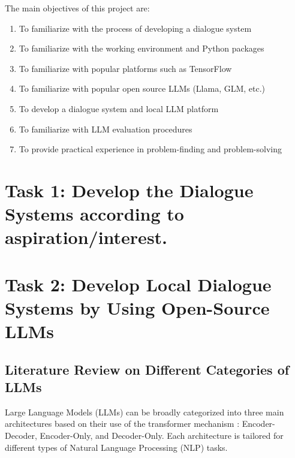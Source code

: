 \documentclass[12pt,a4paper]{article}
\begin{document}
The main objectives of this project are:
\begin{enumerate}
    \item To familiarize with the process of developing a dialogue system
    \item To familiarize with the working environment and Python packages
    \item To familiarize with popular platforms such as TensorFlow
    \item To familiarize with popular open source LLMs (Llama, GLM, etc.)
    \item To develop a dialogue system and local LLM platform
    \item To familiarize with LLM evaluation procedures
    \item To provide practical experience in problem-finding and problem-solving
\end{enumerate}


\section{Task 1: Develop the Dialogue Systems according to aspiration/interest.}

\section{Task 2: Develop Local Dialogue Systems by Using Open-Source LLMs}

\subsection{Literature Review on Different Categories of LLMs}

Large Language Models (LLMs) can be broadly categorized into three main architectures based on their use of the transformer mechanism \cite{vaswani2017attention}: Encoder-Decoder, Encoder-Only, and Decoder-Only. Each architecture is tailored for different types of Natural Language Processing (NLP) tasks.
\end{document}
